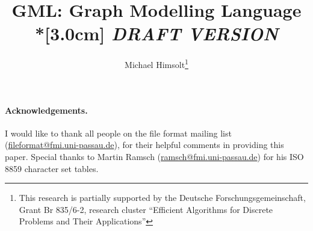 \documentclass[twoside,a4paper,fleqn]{report}
\begin{document}


\title{GML: Graph Modelling Language
  \\*[3.0cm]
  {\emph{DRAFT VERSION}}
  }

\author{Michael Himsolt\thanks{        
    This research is partially supported by the Deutsche
    Forschungsgemeinschaft, Grant Br 835/6-2,
    research cluster ``Efficient Algorithms for
    Discrete Problems and Their Applications''
    }
}

\maketitle



\paragraph{Acknowledgements.} I would like to thank all people on the 
file format mailing list (\url{fileformat@fmi.uni-passau.de}),
for their helpful comments in providing this paper.  Special
thanks to Martin Ramsch (\url{ramsch@fmi.uni-passau.de}) for his
ISO 8859 character set tables.

\tableofcontents



\appendix


\end{document}
